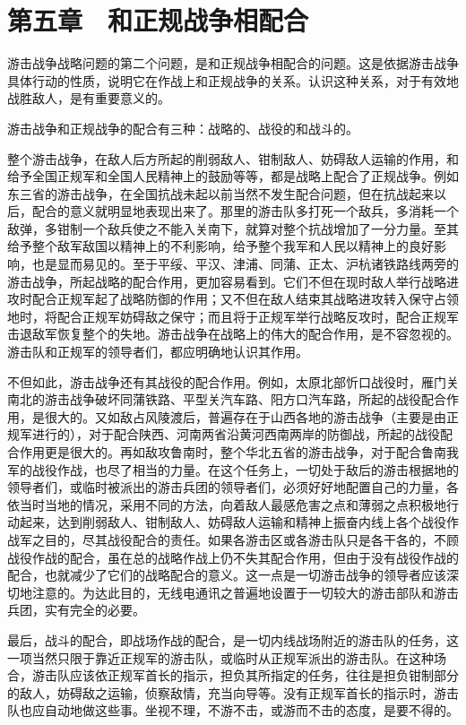 \section{第五章　和正规战争相配合}

游击战争战略问题的第二个问题，是和正规战争相配合的问题。这是依据游击战争具体行动的性质，说明它在作战上和正规战争的关系。认识这种关系，对于有效地战胜敌人，是有重要意义的。

游击战争和正规战争的配合有三种：战略的、战役的和战斗的。

整个游击战争，在敌人后方所起的削弱敌人、钳制敌人、妨碍敌人运输的作用，和给予全国正规军和全国人民精神上的鼓励等等，都是战略上配合了正规战争。例如东三省的游击战争，在全国抗战未起以前当然不发生配合问题，但在抗战起来以后，配合的意义就明显地表现出来了。那里的游击队多打死一个敌兵，多消耗一个敌弹，多钳制一个敌兵使之不能入关南下，就算对整个抗战增加了一分力量。至其给予整个敌军敌国以精神上的不利影响，给予整个我军和人民以精神上的良好影响，也是显而易见的。至于平绥、平汉、津浦、同蒲、正太、沪杭诸铁路线两旁的游击战争，所起战略的配合作用，更加容易看到。它们不但在现时敌人举行战略进攻时配合正规军起了战略防御的作用；又不但在敌人结束其战略进攻转入保守占领地时，将配合正规军妨碍敌之保守；而且将于正规军举行战略反攻时，配合正规军击退敌军恢复整个的失地。游击战争在战略上的伟大的配合作用，是不容忽视的。游击队和正规军的领导者们，都应明确地认识其作用。

不但如此，游击战争还有其战役的配合作用。例如，太原北部忻口战役时，雁门关南北的游击战争破坏同蒲铁路、平型关汽车路、阳方口汽车路，所起的战役配合作用，是很大的。又如敌占风陵渡后，普遍存在于山西各地的游击战争（主要是由正规军进行的），对于配合陕西、河南两省沿黄河西南两岸的防御战，所起的战役配合作用更是很大的。再如敌攻鲁南时，整个华北五省的游击战争，对于配合鲁南我军的战役作战，也尽了相当的力量。在这个任务上，一切处于敌后的游击根据地的领导者们，或临时被派出的游击兵团的领导者们，必须好好地配置自己的力量，各依当时当地的情况，采用不同的方法，向着敌人最感危害之点和薄弱之点积极地行动起来，达到削弱敌人、钳制敌人、妨碍敌人运输和精神上振奋内线上各个战役作战军之目的，尽其战役配合的责任。如果各游击区或各游击队只是各干各的，不顾战役作战的配合，虽在总的战略作战上仍不失其配合作用，但由于没有战役作战的配合，也就减少了它们的战略配合的意义。这一点是一切游击战争的领导者应该深切地注意的。为达此目的，无线电通讯之普遍地设置于一切较大的游击部队和游击兵团，实有完全的必要。

最后，战斗的配合，即战场作战的配合，是一切内线战场附近的游击队的任务，这一项当然只限于靠近正规军的游击队，或临时从正规军派出的游击队。在这种场合，游击队应该依正规军首长的指示，担负其所指定的任务，往往是担负钳制部分的敌人，妨碍敌之运输，侦察敌情，充当向导等。没有正规军首长的指示时，游击队也应自动地做这些事。坐视不理，不游不击，或游而不击的态度，是要不得的。

